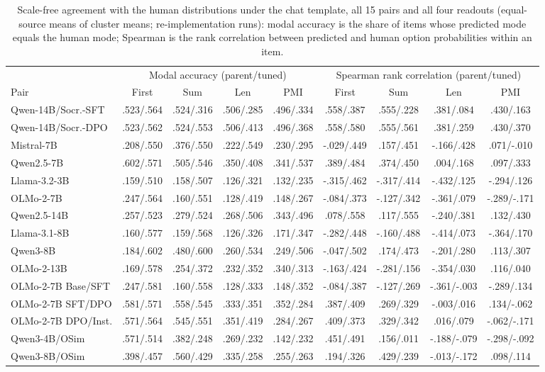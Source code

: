 \begin{table}[t]
\centering\scriptsize
\setlength{\tabcolsep}{3pt}
\begin{tabular}{@{}lcccccccc@{}}
\toprule
& \multicolumn{4}{c}{Modal accuracy (parent/tuned)} & \multicolumn{4}{c}{Spearman rank correlation (parent/tuned)} \\
\cmidrule(lr){2-5}\cmidrule(l){6-9}
Pair & First & Sum & Len & PMI & First & Sum & Len & PMI \\
\midrule
Qwen-14B/Socr.-SFT & .523/.564 & .524/.316 & .506/.285 & .496/.334 & .558/.387 & .555/.228 & .381/.084 & .430/.163 \\
Qwen-14B/Socr.-DPO & .523/.562 & .524/.553 & .506/.413 & .496/.368 & .558/.580 & .555/.561 & .381/.259 & .430/.370 \\
Mistral-7B & .208/.550 & .376/.550 & .222/.549 & .230/.295 & -.029/.449 & .157/.451 & -.166/.428 & .071/-.010 \\
Qwen2.5-7B & .602/.571 & .505/.546 & .350/.408 & .341/.537 & .389/.484 & .374/.450 & .004/.168 & .097/.333 \\
Llama-3.2-3B & .159/.510 & .158/.507 & .126/.321 & .132/.235 & -.315/.462 & -.317/.414 & -.432/.125 & -.294/.126 \\
OLMo-2-7B & .247/.564 & .160/.551 & .128/.419 & .148/.267 & -.084/.373 & -.127/.342 & -.361/.079 & -.289/-.171 \\
Qwen2.5-14B & .257/.523 & .279/.524 & .268/.506 & .343/.496 & .078/.558 & .117/.555 & -.240/.381 & .132/.430 \\
Llama-3.1-8B & .160/.577 & .159/.568 & .126/.326 & .171/.347 & -.282/.448 & -.160/.488 & -.414/.073 & -.364/.170 \\
Qwen3-8B & .184/.602 & .480/.600 & .260/.534 & .249/.506 & -.047/.502 & .174/.473 & -.201/.280 & .113/.307 \\
OLMo-2-13B & .169/.578 & .254/.372 & .232/.352 & .340/.313 & -.163/.424 & -.281/.156 & -.354/.030 & .116/.040 \\
OLMo-2-7B Base/SFT & .247/.581 & .160/.558 & .128/.333 & .148/.352 & -.084/.387 & -.127/.269 & -.361/-.003 & -.289/.134 \\
OLMo-2-7B SFT/DPO & .581/.571 & .558/.545 & .333/.351 & .352/.284 & .387/.409 & .269/.329 & -.003/.016 & .134/-.062 \\
OLMo-2-7B DPO/Inst. & .571/.564 & .545/.551 & .351/.419 & .284/.267 & .409/.373 & .329/.342 & .016/.079 & -.062/-.171 \\
Qwen3-4B/OSim & .571/.514 & .382/.248 & .269/.232 & .142/.232 & .451/.491 & .156/.011 & -.188/-.079 & -.298/-.092 \\
Qwen3-8B/OSim & .398/.457 & .560/.429 & .335/.258 & .255/.263 & .194/.326 & .429/.239 & -.013/-.172 & .098/.114 \\
\bottomrule
\end{tabular}
\caption{Scale-free agreement with the human distributions under the chat template, all 15 pairs and all four readouts (equal-source means of cluster means; re-implementation runs): modal accuracy is the share of items whose predicted mode equals the human mode; Spearman is the rank correlation between predicted and human option probabilities within an item.}
\label{tab:scale-free}
\end{table}
